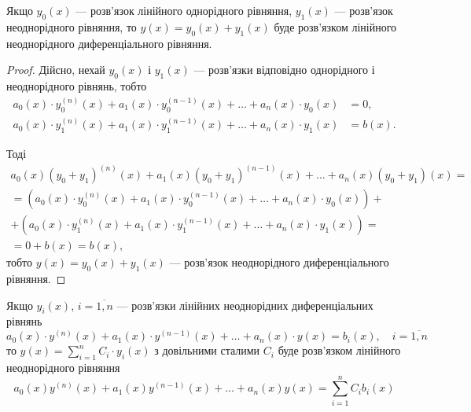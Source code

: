 \begin{property}
	\label{prop:3.3.1}
	Якщо $y_0(x)$ --- розв'язок лінійного однорідного рівняння, $y_1(x)$ --- розв'язок неоднорідного рівняння, то $y(x) = y_0(x) + y_1(x)$ буде розв'язком лінійного неоднорідного диференціального рівняння.
\end{property}

\begin{proof}
	Дійсно, нехай $y_0(x)$ і $y_1(x)$ --- розв'язки відповідно однорідного і неоднорідного рівнянь, тобто
	\begin{align*}
		a_0(x) \cdot y_0^{(n)}(x) + a_1(x) \cdot y_0^{(n - 1)}(x) + \ldots + a_n(x) \cdot y_0(x) &= 0, \\
		a_0(x) \cdot y_1^{(n)}(x) + a_1(x) \cdot y_1^{(n - 1)}(x) + \ldots + a_n(x) \cdot y_1(x) &= b(x).
	\end{align*}	
	
	Тоді 
	\begin{multline*}
		a_0(x) (y_0 + y_1)^{(n)}(x) + a_1(x) (y_0 + y_1)^{(n - 1)}(x) + \ldots + a_n(x) (y_0 + y_1)(x) = \\ = \left( a_0(x) \cdot y_0^{(n)}(x) + a_1(x) \cdot y_0^{(n - 1)}(x) + \ldots + a_n(x) \cdot y_0(x) \right) + \\ + \left( a_0(x) \cdot y_1^{(n)}(x) + a_1(x) \cdot y_1^{(n - 1)}(x) + \ldots + a_n(x) \cdot y_1(x) \right) = \\ = 0 + b(x) = b(x),
	\end{multline*}
	тобто $y(x) = y_0(x) + y_1(x)$ --- розв'язок неоднорідного диференціального рівняння.
\end{proof}

\begin{property}
	Якщо $y_i(x)$, $i = \overline{1, n}$ --- розв'язки лінійних неоднорідних диференціальних рівнянь
	\begin{equation*}
		a_0(x) \cdot y^{(n)}(x) + a_1(x) \cdot y^{(n - 1)}(x) + \ldots + a_n(x) \cdot y(x) = b_i(x), \quad i = \overline{1, n}
	\end{equation*}
	то $y(x) = \sum_{i = 1}^n C_i \cdot y_i(x)$ з довільними сталими $C_i$ буде розв'язком лінійного неоднорідного рівняння
	\begin{equation*}
		a_0(x) y^{(n)}(x) + a_1(x) y^{(n - 1)}(x) + \ldots + a_n(x) y(x) = \sum_{i = 1}^n C_i  b_i(x)
	\end{equation*}
\end{property}

